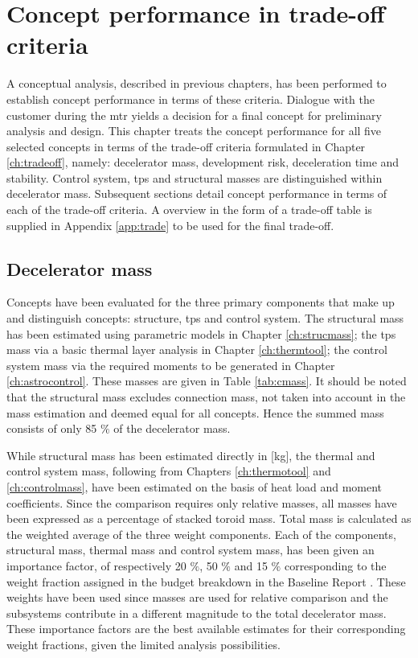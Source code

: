 \section{Concept performance in trade-off criteria}\label{ch:tfsum}

 A conceptual analysis, described in previous chapters, has been performed to establish concept performance in terms of these criteria. Dialogue with the customer during the \acrfull{mtr} yields a decision for a final concept for preliminary analysis and design. This chapter treats the concept performance for all five selected concepts in terms of the trade-off criteria formulated in Chapter \ref{ch:tradeoff}, namely: decelerator mass, development risk, deceleration time and stability. Control system, \acrfull{tps} and structural masses are distinguished within decelerator mass. Subsequent sections detail concept performance in terms of each of the trade-off criteria. A overview in the form of a trade-off table is supplied in Appendix \ref{app:trade} to be used for the final trade-off.

\subsection{Decelerator mass}
Concepts have been evaluated for the three primary components that make up and distinguish concepts: structure, \acrfull{tps} and control system. The structural mass has been estimated using parametric models in Chapter \ref{ch:strucmass}; the \gls{tps} mass via a basic thermal layer analysis in Chapter \ref{ch:thermtool}; the control system mass via the required moments to be generated in Chapter \ref{ch:astrocontrol}.  These masses are given in Table \ref{tab:cmass}. It should be noted that the structural mass excludes connection mass, not taken into account in the mass estimation and deemed equal for all concepts. Hence the summed mass consists of only 85 $\%$ of the decelerator mass. 

While structural mass has been estimated directly in [kg], the thermal and control system mass, following from Chapters \ref{ch:thermotool} and \ref{ch:controlmass}, have been estimated on the basis of heat load and moment coefficients. Since the comparison requires only relative masses, all  masses have been expressed as a percentage of stacked toroid mass. Total mass is calculated as the weighted average of the three weight components. Each of the components, structural mass, thermal mass and control system mass, has been given an importance factor, of respectively 20 $\%$,  50 $\%$ and  15 $\%$ corresponding to the weight fraction assigned in the budget breakdown in the Baseline Report \cite[p.28]{Balasooriyan2015a}. These weights have been used since masses are used for relative comparison and the subsystems contribute in a different magnitude to the total decelerator mass. These importance factors are the best available estimates for their corresponding weight fractions, given the limited analysis possibilities.

